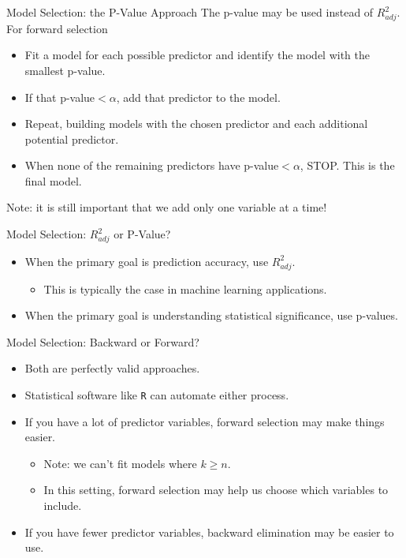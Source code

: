 \begin{frame}{Model Selection: the P-Value Approach}
    The p-value may be used instead of $R^2_{adj}$. For forward selection
    \begin{itemize}
        \item Fit a model for each possible predictor and identify the model with the smallest p-value.
        \item If that p-value$< \alpha$, add that predictor to the model.
        \item Repeat, building models with the chosen predictor and each additional potential predictor.
        \item When none of the remaining predictors have p-value$<\alpha$, STOP. This is the final model.
    \end{itemize}
    Note: it is still important that we add only one variable at a time!
\end{frame}

\begin{frame}{Model Selection: $R^2_{adj}$ or P-Value?}
    \begin{itemize}
        \item When the primary goal is prediction accuracy, use $R^2_{adj}$.
        \begin{itemize}
            \item This is typically the case in machine learning applications.
        \end{itemize}
        \item When the primary goal is understanding statistical significance, use p-values.
    \end{itemize}
\end{frame}

\begin{frame}{Model Selection: Backward or Forward?}
    \begin{itemize}
        \item Both are perfectly valid approaches.
        \item Statistical software like \texttt{R} can automate either process.
        \item If you have a lot of predictor variables, forward selection may make things easier.
        \begin{itemize}
            \item Note: we can't fit models where $k \ge n$. 
            \item In this setting, forward selection may help us choose which variables to include. 
        \end{itemize}
        \item If you have fewer predictor variables, backward elimination may be easier to use. 
    \end{itemize}
\end{frame}

